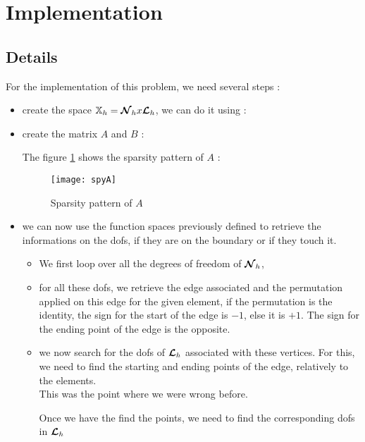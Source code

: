 \section{Implementation}
\subsection{Details}

For the implementation of this problem, we need several steps :
\begin{itemize}
\item
  create the space $\mathbb{X}_h={\bm{\mathcal{N}}}_hx{\bm{\mathcal{L}}}_h$, we can do it using :
  
\item
  create the matrix $A$ and $B$ :
  
  The figure \ref{spyA} shows the sparsity pattern of $A$ : 
  \begin{figure}[H]
    \centering
    \texttt{[image: spyA]}
    \caption{Sparsity pattern of $A$}
    \label{spyA}
  \end{figure}
\item
  we can now use the function spaces previously defined to retrieve the
  informations on the dofs, if they are on the boundary or if they touch it.\\
  \begin{itemize}
  \item
    We first loop over all the degrees of freedom of ${\bm{\mathcal{N}}}_h$,
    
  \item
    for all these dofs, we retrieve the edge associated and the permutation applied on this edge for the given element, if the permutation is the identity, the sign for the start of the edge is $-1$, else it is $+1$. The sign for the ending point of the edge is the opposite.
    
  \item
    we now search for the dofs of ${\bm{\mathcal{L}}}_h$ associated with these vertices. For this, we need to find the starting and ending points of the edge, relatively to the elements.\\
    This was the point where we were wrong before.
    
    Once we have the find the points, we need to find the corresponding dofs in ${\bm{\mathcal{L}}}_h$
    

\end{itemize}
\end{itemize}
